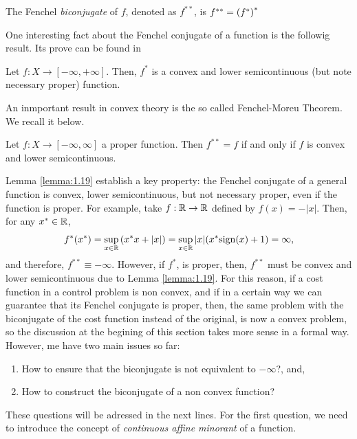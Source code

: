 \begin{definition}\label{def:fench_biconj}
     The Fenchel \textit{biconjugate} of $f$, denoted as $f^{**}$, is $f^{**}=\left(f^*\right)^*$
 \end{definition}

One interesting fact about the Fenchel conjugate of a function is the followig result. Its prove can be found in \cite[Proposition 13.13]{combettes}

\begin{lemma}\label{lemma:1.19}
    Let $f:X\to [-\infty, +\infty]$. Then, $f^{*}$ is a convex and lower semicontinuous (but note necessary proper) function.
\end{lemma}
An inmportant result in convex theory is the so called Fenchel-Moreu Theorem. We recall it below.

\begin{theorem}\label{th:fenchel-moreau}
     Let $f:X\to[-\infty,\infty]$ a proper function. Then $f^{**}=f$ if and only if $f$ is convex and lower semicontinuous.
 \end{theorem}
 

  Lemma \ref{lemma:1.19} establish a key property: the Fenchel conjugate of a general function is convex, lower semicontinuous, but not necessary proper, even if the function is proper. For example, take $f:\mathbb{R}\to\mathbb{R}$ defined by $f(x)=-|x|$. Then, for any $x^*\in \mathbb{R}$,
 \[
 f^{*}(x^*)=\sup_{x\in \mathbb{R}}\left(x^* x+|x|\right)=\sup_{x\in \mathbb{R}}|x|(x^*\mathrm{sign}(x)+1)=\infty,
 \]
 and therefore, $f^{**}\equiv -\infty$. However, if $f^{*}$, is proper, then, $f^{**}$ must be convex and lower semicontinuous due to Lemma \ref{lemma:1.19}. For this reason, if a cost function in a control problem is non convex, and if in a certain way we can guarantee that its Fenchel conjugate is proper, then, the same problem with the biconjugate of the cost function instead of the original, is now a convex problem, so the discussion at the begining of this section takes more sense in a formal way. However, me have two main issues so far:
 \begin{enumerate}
    \item How to ensure that the biconjugate is not equivalent to $-\infty$?, and,
     \item How to construct the biconjugate of a non convex function?
 \end{enumerate}
 
 These questions will be adressed in the next lines. For the first question, we need to introduce the concept of \textit{continuous affine minorant} of a function.
 
